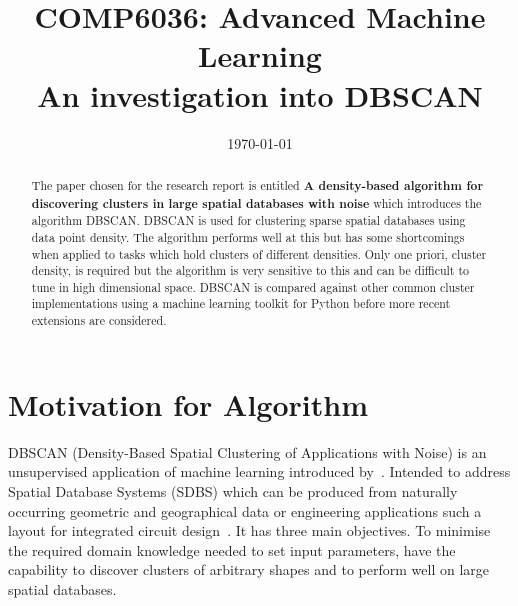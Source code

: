\documentclass{ecsarticle}     %
\begin{document}
\frontmatter
\title      {COMP6036: Advanced Machine Learning\\
            An investigation into DBSCAN}
      
\addresses  {\deptname\\\univname}

\date       {\today}
\subject    {}
\keywords   {}
\maketitle


\begin{abstract}
The paper chosen for the research report is entitled \textbf{A density-based algorithm for discovering clusters in large spatial databases with noise} which introduces the algorithm DBSCAN.
DBSCAN is used for clustering sparse spatial databases using data point density.
The algorithm performs well at this but has some shortcomings when applied to tasks which hold clusters of different densities.
Only one priori, cluster density, is required but the algorithm is very sensitive to this and can be difficult to tune in high dimensional space.
DBSCAN is compared against other common cluster implementations using a machine learning toolkit for Python before more recent extensions are considered.
\end{abstract}

\mainmatter


\section{Motivation for Algorithm}

DBSCAN (Density-Based Spatial Clustering of Applications with Noise) is an unsupervised application of machine learning introduced by~\cite{ester96dbscan}.
Intended to address Spatial Database Systems (SDBS) which can be produced from naturally occurring geometric and geographical data or engineering applications such a layout for integrated circuit design~\citep{guting94sdbs}.
It has three main objectives.
To minimise the required domain knowledge needed to set input parameters, have the capability to discover clusters of arbitrary shapes and to perform well on large spatial databases.
\end{document}
